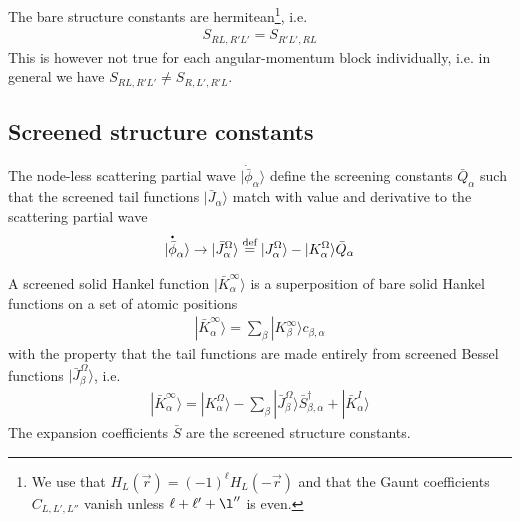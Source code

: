 \documentclass[11pt,a4paper]{report}
\begin{document}
The bare structure constants are hermitean\footnote{We use that
  $H_L(\vec{r})=(-1)^\ell H_L(-\vec{r})$ and that the Gaunt
  coefficients $C_{L,L',L''}$ vanish unless $\ell+\ell'+\l''$ is
  even.}, i.e.
\begin{eqnarray}
S_{RL,R'L'}=S_{R'L',RL}
\end{eqnarray}
This is however not true for each angular-momentum block individually,
i.e. in general we have $S_{RL,R'L'}\neq S_{R,L',R'L}$.

\subsection{Screened structure constants}
The node-less scattering partial wave
$|\dot{\bar{\phi}}_\alpha\rangle$ define the screening constants
$\bar{Q}_{\alpha}$ such that the screened tail functions
$|\bar{J}_\alpha\rangle$ match with value and derivative to the
scattering partial wave
\begin{eqnarray}
|\overset{\mbox{\large\bfseries .}}{\bar{\phi}}_\alpha\rangle \rightarrow 
|\bar{J}^{\Omega}_{\alpha}\rangle
\stackrel{\text{def}}{=}
|J^{\Omega}_{\alpha}\rangle
-|K^{\Omega}_{\alpha}\rangle \bar{Q}_{\alpha}
\end{eqnarray}

A screened solid Hankel function $|\bar{K}_{\alpha}^\infty\rangle$ is
a superposition of bare solid Hankel functions on a set of atomic
positions
\begin{eqnarray}
|\bar{K}^\infty_\alpha\rangle=\sum_\beta|K^\infty_\beta\rangle c_{\beta,\alpha}
\label{eq:kbarassuperposofkbare}
\end{eqnarray}
with the property that the tail functions are made entirely
from screened Bessel functions $|\bar{J}^\Omega_{\beta}\rangle$, i.e.
\begin{eqnarray}
|\bar{K}_{\alpha}^\infty\rangle=|K^\Omega_{\alpha}\rangle
-\sum_{\beta}|\bar{J}^\Omega_{\beta}\rangle \bar{S}^\dagger_{\beta,\alpha}
+|\bar{K}^I_{\alpha}\rangle
\label{eq:kbarwithsbar}
\end{eqnarray}
The expansion coefficients $\bar{S}$ are the screened structure
constants.
\end{document}

